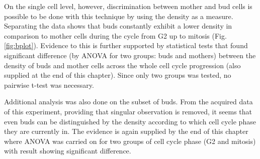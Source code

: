 On the single cell level, however, discrimination between mother and bud cells is possible to be done with this technique by using the density as a measure. 
Separating the data shows that buds constantly exhibit a lower density in comparison to mother cells during the cycle from G2 up to mitosis (Fig.\ref{fig:bplot}). 
Evidence to this is further supported by statistical tests that found significant difference (by ANOVA for two groups: buds and mothers) between the density of buds and mother cells across the whole cell cycle progression (also supplied at the end of this chapter). 
Since only two groups was tested, no pairwise t-test was necessary.

Additional analysis was also done on the subset of buds. 
From the acquired data of this experiment, providing that singular observation is removed, it seems that even buds can be distinguished by the density according to which cell cycle phase they are currently in. 
The evidence is again supplied by the end of this chapter where ANOVA was carried on for two groups of cell cycle phase (G2 and mitosis) with result showing significant difference.




\renewcommand{\refname}{\spacedlowsmallcaps{References}} %
%

